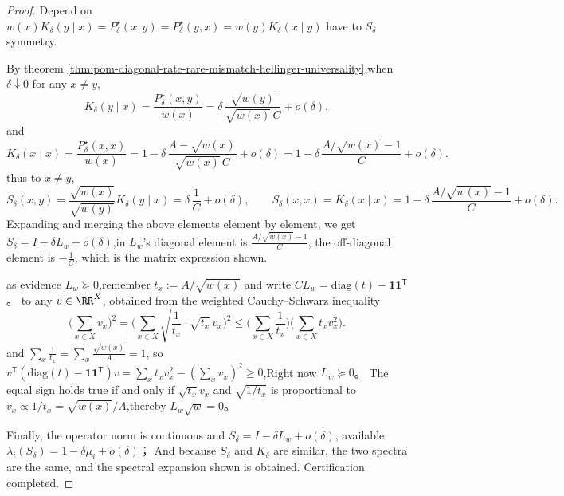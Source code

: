 \begin{proof}
Depend on \(w(x)K_\delta(y\mid x)=P^\star_\delta(x,y)=P^\star_\delta(y,x)=w(y)K_\delta(x\mid y)\) have to \(S_\delta\) symmetry.
\par
By theorem \ref{thm:pom-diagonal-rate-rare-mismatch-hellinger-universality},when \(\delta\downarrow 0\) for any \(x\ne y\),
\[
K_\delta(y\mid x)=\frac{P^\star_\delta(x,y)}{w(x)}
=\delta\,\frac{\sqrt{w(y)}}{\sqrt{w(x)}\,C}+o(\delta),
\]
and
\[
K_\delta(x\mid x)=\frac{P^\star_\delta(x,x)}{w(x)}
=1-\delta\,\frac{A-\sqrt{w(x)}}{\sqrt{w(x)}\,C}+o(\delta)
=1-\delta\,\frac{A/\sqrt{w(x)}-1}{C}+o(\delta).
\]
thus to \(x\ne y\),
\[
S_\delta(x,y)
=\frac{\sqrt{w(x)}}{\sqrt{w(y)}}K_\delta(y\mid x)
=\delta\,\frac{1}{C}+o(\delta),
\qquad
S_\delta(x,x)=K_\delta(x\mid x)=1-\delta\,\frac{A/\sqrt{w(x)}-1}{C}+o(\delta).
\]
Expanding and merging the above elements element by element, we get \(S_\delta=I-\delta L_w+o(\delta)\),in \(L_w\)'s diagonal element is \(\frac{A/\sqrt{w(x)}-1}{C}\), the off-diagonal element is \(-\frac{1}{C}\), which is the matrix expression shown.
\par
as evidence \(L_w\succeq 0\),remember \(t_x:=A/\sqrt{w(x)}\) and write
\(
CL_w=\mathrm{diag}(t)-\mathbf 1\mathbf 1^{\mathsf T}
\)。
to any \(v\in\RR^X\), obtained from the weighted Cauchy--Schwarz inequality
\[
\biggl(\sum_{x\in X}v_x\biggr)^2
=\biggl(\sum_{x\in X}\sqrt{\frac{1}{t_x}}\cdot \sqrt{t_x}\,v_x\biggr)^2
\le \biggl(\sum_{x\in X}\frac{1}{t_x}\biggr)\biggl(\sum_{x\in X}t_xv_x^2\biggr).
\]
and
\(
\sum_x\frac{1}{t_x}=\sum_x\frac{\sqrt{w(x)}}{A}=1
\), so
\(
v^{\mathsf T}(\mathrm{diag}(t)-\mathbf 1\mathbf 1^{\mathsf T})v
=\sum_x t_xv_x^2-(\sum_x v_x)^2\ge 0
\),Right now \(L_w\succeq 0\)。
The equal sign holds true if and only if \(\sqrt{t_x}v_x\) and \(\sqrt{1/t_x}\) is proportional to \(v_x\propto 1/t_x=\sqrt{w(x)}/A\),thereby \(L_w\sqrt w=0\)。
\par
Finally, the operator norm is continuous and \(S_\delta=I-\delta L_w+o(\delta)\), available
\(
\lambda_i(S_\delta)=1-\delta\mu_i+o(\delta)
\)；
And because \(S_\delta\) and \(K_\delta\) are similar, the two spectra are the same, and the spectral expansion shown is obtained. Certification completed.
\end{proof}



